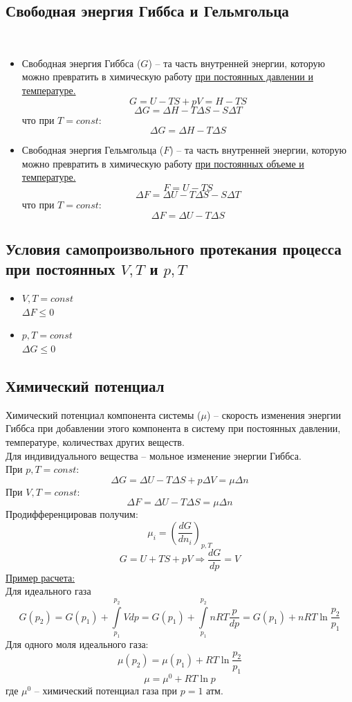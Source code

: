 \documentclass[14pt,a4paper]{scrartcl}
\begin{document}
	\subsection*{Свободная энергия Гиббса и Гельмгольца}\
	\begin{itemize}
		\item Свободная энергия Гиббса ($G$) -- та часть внутренней энергии, которую можно превратить в химическую работу \ul{при постоянных давлении и температуре.}
		\[
		G = U - TS + pV = H - TS
		\]
		\[
		\Delta{G} = \Delta{H} - T \Delta{S} - S \Delta{T}
		\]
		что при $T = const$:
		\[
		\Delta{G} = \Delta{H} - T \Delta{S} 
		\]
		\item Свободная энергия Гельмгольца ($F$) -- та часть внутренней энергии, которую можно превратить в химическую работу \ul{при постоянных объеме и температуре.} 
		\[
		F = U -TS
		\]
		\[
		\Delta{F} = \Delta{U} - T \Delta{S} - S \Delta{T}
		\]
		что при $T = const$:
		\[
		\Delta{F} = \Delta{U} - T \Delta{S} 
		\]
		
	\end{itemize}
	\subsection*{Условия самопроизвольного протекания процесса при постоянных $V, T$ и $p, T$} 
	\begin{itemize}
		\item $ V, T = const $ \\
		$ \Delta{F} \leqslant 0 $
		\item $ p, T = const$ \\
		$ \Delta{G} \leqslant 0 $
	\end{itemize}
	
	\subsection*{Химический потенциал} 
	Химический потенциал компонента системы ($\mu$) -- скорость изменения энергии Гиббса при добавлении этого компонента в систему при постоянных давлении, температуре, количествах других веществ. \\
	Для индивидуального вещества -- мольное изменение энергии Гиббса. \\
	При $p, T = const $:
	\[
	\Delta{G} = \Delta{U} - T \Delta{S} + p \Delta{V} = \mu \Delta{n}
	\]
	При $V, T = const $:
	\[
	\Delta{F} = \Delta{U} - T \Delta{S} = \mu \Delta{n}
	\]
	Продифференцировав получим:
	\[
	\mu_i = \left(\dfrac{dG}{dn_i}\right)_{p,T}
	\]
	\[
	G = U + TS + pV \Rightarrow \dfrac{dG}{dp} = V
	\]
	\ul{Пример расчета:} \\
	Для идеального газа 
	\[
	G(p_2) = G (p_1) + \int\limits_{p_1}^{p_2} V dp = G(p_1) + \int\limits_{p_1}^{p_2} nRT \dfrac{p}{dp} = G(p_1) + nRT \ln{\dfrac{p_2}{p_1}}	
	\]
	Для одного моля идеального газа:
	\[
	\mu (p_2) = \mu(p_1) + RT \ln{\dfrac{p_2}{p_1}}	
	\]
	\[
	\mu = \mu^0 + RT \ln{p}
	\]
	где $\mu^0$ -- химический потенциал газа при $p = 1$ атм.
\end{document}
